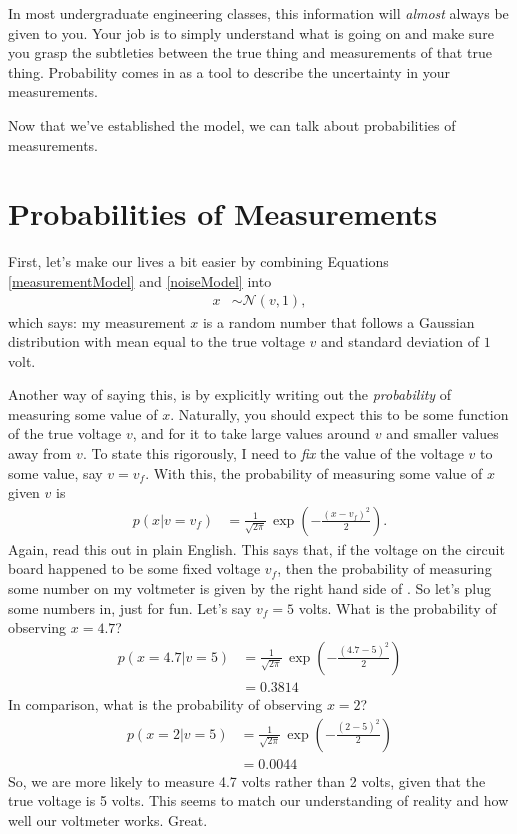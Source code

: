 \documentclass[10pt]{article}
\begin{document}
In most undergraduate engineering classes, this information will \emph{almost} always be given to you. Your job is to simply understand what is going on and make sure you grasp the subtleties between the true thing and measurements of that true thing. Probability comes in as a tool to describe the uncertainty in your measurements.

Now that we've established the model, we can talk about probabilities of measurements.

\section{Probabilities of Measurements}
First, let's make our lives a bit easier by combining Equations \eqref{measurementModel} and \eqref{noiseModel} into
\begin{align}
	x &\sim \mathcal{N}(v,1),
\end{align}
which says: my measurement $x$ is a random number that follows a Gaussian distribution with mean equal to the true voltage $v$ and standard deviation of $1$ volt.

Another way of saying this, is by explicitly writing out the \emph{probability} of measuring some value of $x$. Naturally, you should expect this to be some function of the true voltage $v$, and for it to take large values around $v$ and smaller values away from $v$. To state this rigorously, I need to \emph{fix} the value of the voltage $v$ to some value, say $v = v_f$. With this, the probability of measuring some value of $x$ given $v$ is
\begin{align}
	p(x \vert v=v_f) &= \frac{1}{\sqrt{2\pi}}\,\exp\left( -\frac{(x-v_f)^2}{2} \right) \label{prob}.
\end{align}
Again, read this out in plain English. This says that, if the voltage on the circuit board happened to be some fixed voltage $v_f$, then the probability of measuring some number on my voltmeter is given by the right hand side of . So let's plug some numbers in, just for fun. Let's say $v_f = 5$ volts. What is the probability of observing $x=4.7$?
\begin{align}
	p(x=4.7 \vert v = 5) &= \frac{1}{\sqrt{2\pi}}\,\exp\left(-\frac{(4.7-5)^2}{2} \right)\\
						 &= 0.3814
\end{align}
In comparison, what is the probability of observing $x=2$?
\begin{align}
	p(x=2 \vert v = 5) &= \frac{1}{\sqrt{2\pi}}\,\exp\left(-\frac{(2-5)^2}{2} \right)\\
						 &= 0.0044
\end{align}
So, we are more likely to measure 4.7 volts rather than 2 volts, given that the true voltage is 5 volts. This seems to match our understanding of reality and how well our voltmeter works. Great.
\end{document}

